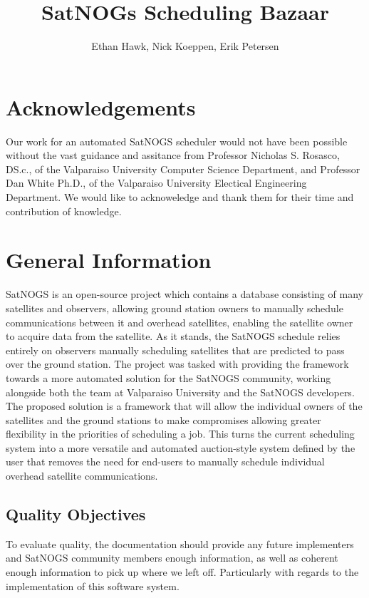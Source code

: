 \documentclass{article}
\author{Ethan Hawk, Nick Koeppen, Erik Petersen}
\title{SatNOGs Scheduling Bazaar}
\begin{document}
\maketitle
\tableofcontents

\section{Acknowledgements}
Our work for an automated SatNOGS scheduler would not have been possible without the vast guidance and assitance from Professor Nicholas S. Rosasco, DS.c., of the Valparaiso University Computer Science Department, and Professor Dan White Ph.D., of the Valparaiso University Electical Engineering Department. We would like to acknoweledge and thank them for their time and contribution of knowledge.


\section{General Information}

SatNOGS is an open-source project which contains a database consisting of many
satellites and observers, allowing ground station owners to manually schedule
communications between it and overhead satellites, enabling the satellite owner
to acquire data from the satellite. As it stands, the SatNOGS schedule relies
entirely on observers manually scheduling satellites that are predicted to pass
over the ground station. The project was tasked with providing the framework
towards a more automated solution for the SatNOGS community, working alongside
both the team at Valparaiso University and the SatNOGS developers. The proposed
solution is a framework that will allow the individual owners of the satellites
and the ground stations to make compromises allowing greater flexibility in the
priorities of scheduling a job. This turns the current scheduling system into a
more versatile and automated auction-style system defined by the user that
removes the need for end-users to manually schedule individual overhead
satellite communications.

\subsection{Quality Objectives}

To evaluate quality, the documentation should provide any future implementers
and SatNOGS community members enough information, as well as coherent enough
information to pick up where we left off. Particularly with regards to the
implementation of this software system.
\end{document}
